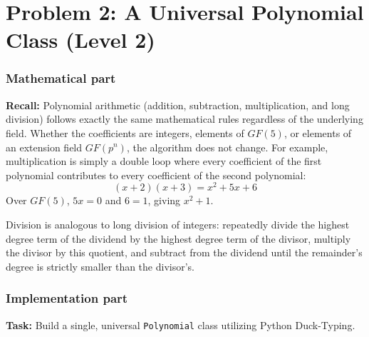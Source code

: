 \section*{Problem 2: A Universal Polynomial Class (Level 2)}

\subsubsection*{Mathematical part}
\textbf{Recall:} Polynomial arithmetic (addition, subtraction, multiplication, and long division) follows exactly the same mathematical rules regardless of the underlying field. Whether the coefficients are integers, elements of $GF(5)$, or elements of an extension field $GF(p^n)$, the algorithm does not change.
For example, multiplication is simply a double loop where every coefficient of the first polynomial contributes to every coefficient of the second polynomial:
\[
(x+2)(x+3) = x^2 + 5x + 6
\]
Over $GF(5)$, $5x=0$ and $6=1$, giving $x^2+1$. 

Division is analogous to long division of integers: repeatedly divide the highest degree term of the dividend by the highest degree term of the divisor, multiply the divisor by this quotient, and subtract from the dividend until the remainder's degree is strictly smaller than the divisor's.

\subsubsection*{Implementation part}
\textbf{Task:} Build a single, universal \lstinline|Polynomial| class utilizing Python Duck-Typing.


